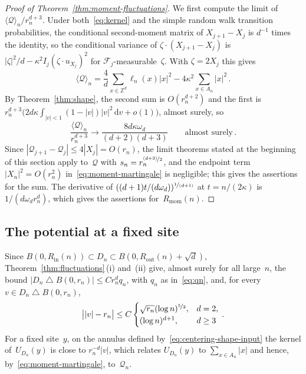 \documentclass[11pt]{amsart}
\theoremstyle{plain}
\theoremstyle{definition}
\newcommand{\Z}{\mathbb Z}
\newcommand{\drift}{\kappa}
\newcommand{\dd}{\,\mathrm d}
\newcommand{\nf}{\nicefrac}
\newcommand{\Rin}{R_{\mathrm{in}}}
\newcommand{\Rout}{R_{\mathrm{out}}}
\newcommand{\Rmom}{R_{\mathrm{mom}}}
\numberwithin{equation}{section}
\begin{document}
\begin{proof}[Proof of Theorem~\ref{thm:moment-fluctuations}]
We first compute the limit of $\langle\mathcal Q\rangle_n/r_n^{d+3}$. Under both~\eqref{eq:kernel} and the simple random walk transition probabilities, the conditional second-moment matrix of $X_{j+1}-X_j$ is $d^{-1}$ times the identity, so the conditional variance of $\zeta\cdot(X_{j+1}-X_j)$ is $|\zeta|^2/d-\drift^2I_j(\zeta\cdot u_{X_j})^2$ for $\mathcal F_j$-measurable~$\zeta$. With $\zeta=2X_j$ this gives
\begin{equation}\label{eq:moment-exact-bracket}
\langle\mathcal Q\rangle_n=\frac4d\sum_{x\in\Z^d}\ell_n(x)|x|^2-4\drift^2\sum_{x\in A_n}|x|^2\, .
\end{equation}
By Theorem~\ref{thm:shape}, the second sum is $O(r_n^{d+2})$ and the first is $r_n^{d+3}\bigl(2d\drift\int_{|v|<1}(1-|v|)|v|^2\dd v+o(1)\bigr)$, almost surely, so
\begin{equation*}
\frac{\langle\mathcal Q\rangle_n}{r_n^{d+3}}\longrightarrow\frac{8d\drift\omega_d}{(d+2)(d+3)}
\qquad\text{almost surely}\, .
\end{equation*}
Since $|\mathcal Q_{j+1}-\mathcal Q_j|\leq4|X_j|=O(r_n)$, the limit theorems stated at the beginning of this section apply to~$\mathcal Q$ with $s_n=r_n^{\nf{(d+3)}2}$, and the endpoint term $|X_n|^2=O(r_n^2)$ in~\eqref{eq:moment-martingale} is negligible; this gives the assertions for the sum. The derivative of $((d+1)t/(d\omega_d))^{\nf{1}{(d+1)}}$ at $t=n/(2\drift)$ is $1/(d\omega_dr_n^d)$, which gives the assertions for~$\Rmom(n)$.
\end{proof}

\subsection{The potential at a fixed site}

Since $B(0,\Rin(n))\subset D_n\subset B(0,\Rout(n)+\sqrt d)$, Theorem~\ref{thm:fluctuations}\,(i) and~(ii) give, almost surely for all large~$n$, the bound $|D_n\mathbin{\triangle}B(0,r_n)|\leq Cr_n^dq_n$, with $q_n$ as in~\eqref{eq:qn}, and, for every $v\in D_n\mathbin{\triangle}B(0,r_n)$,
\begin{equation}\label{eq:centering-shape-input}
\bigl||v|-r_n\bigr|\leq C\begin{cases}\sqrt{r_n}(\log n)^{\nf52},&d=2,\\(\log n)^{d+1},&d\geq3\end{cases}\, .
\end{equation}
For a fixed site~$y$, on the annulus defined by~\eqref{eq:centering-shape-input} the kernel of~$U_{D_n}(y)$ is close to $r_n^{-d}|v|$, which relates $U_{D_n}(y)$ to $\sum_{x\in A_n}|x|$ and hence, by~\eqref{eq:moment-martingale}, to~$\mathcal Q_n$.
\end{document}
